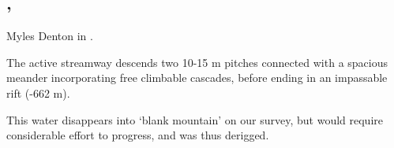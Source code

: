 \subsection{, }


    \begin{marginfigure}
\checkoddpage \ifoddpage \forcerectofloat \else \forceversofloat \fi
\centering
 \caption{Myles Denton in \protect{}. }
 \label{stalemate pitch}
\end{marginfigure}

The active streamway descends two 10-15 m pitches connected with a spacious meander incorporating free climbable cascades, before ending in an impassable rift (-662 m).

This water disappears into `blank mountain' on our survey, but would require considerable effort to progress, and  was thus derigged.



